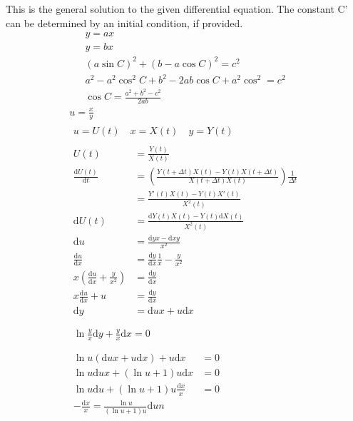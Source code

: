 \documentclass{article}
\newcommand\D[1]{\Delta{#1}}
\newcommand\F[2]{\frac{#1}{#2}}
\newcommand\di[1]{\text{d}#1}
\begin{document}
This is the general solution to the given differential equation. The constant C' can be determined by an initial condition, if provided.
  \begin{gather*}
    y = ax \\
    y = bx \\
    (a\sin{C})^2 + (b-a\cos{C})^2 = c^2 \\
    a^2 - a^2\cos^2{C} + b^2 - 2ab\cos{C} + a^2\cos^2 = c^2 \\
    \cos{C} = \frac{a^2 + b^2 - c^2}{2ab}
  \end{gather*}
  \begin{gather*}
    u = \frac{x}{y} \\
    \begin{gathered}
      u = U(t) \quad x = X(t) \quad y = Y(t)
    \end{gathered} \\
    \begin{aligned}
      U(t) &= \F{Y(t)}{X(t)} \\
      \F{\di{U}(t)}{\di{t}} &= \left( \F{Y(t + \D{t})X(t) - Y(t)X(t + \D{t})}{X(t + \D{t})X(t)} \right) \F{1}{\D{t}} \\
      &= \F{Y'(t)X(t) - Y(t)X'(t)}{X^2(t)} \\
      \di{U}(t) &= \F{\di{Y}(t)X(t) - Y(t)\di{X}(t)}{X^2(t)} \\
      \di{u} & = \F{\di{y}x - \di{x}y}{x^{2}} \\
      \F{\di{u}}{\di{x}} &= \F{\di{y}}{\di{x}}\F{1}{x} - \F{y}{x^2} \\
      x\left( \F{\di{u}}{\di{x}} + \F{y}{x^2} \right) &= \F{\di{y}}{\di{x}} \\
      x\F{\di{u}}{\di{x}} + u &= \F{\di{y}}{\di{x}} \\
      \di{y} &= \di{u}x + u\di{x} \\
    \end{aligned} \\
    \begin{gathered}
      \ln{\F{y}{x}}\di{y} + \F{y}{x}\di{x} = 0 \\
    \end{gathered} \\
    \begin{aligned}
      \ln{u}(\di{u}x + u\di{x}) + u\di{x} &= 0 \\ 
      \ln{u}\di{u}x + ( \ln{u} + 1 ) u\di{x} &= 0 \\
      \ln{u}\di{u} + ( \ln{u} + 1 ) u\F{\di{x}}{x} &= 0 \\
      -\F{\di{x}}{x} = \F{\ln{u}}{\left( \ln{u} + 1 \right)u}\di{u}n
    \end{aligned}
  \end{gather*}
\end{document}
